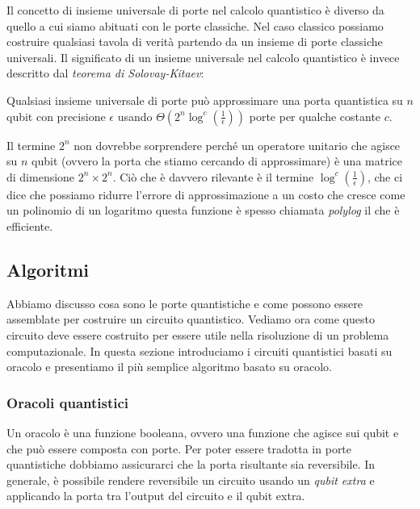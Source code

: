 Il concetto di insieme universale di porte nel calcolo quantistico è diverso da quello a cui siamo abituati con le porte classiche. Nel caso classico possiamo costruire qualsiasi tavola di verità partendo da un insieme di porte classiche universali. Il significato di un insieme universale nel calcolo quantistico è invece descritto dal \emph{teorema di Solovay-Kitaev}:
\begin{theorem}
	Qualsiasi insieme universale di porte può approssimare una porta quantistica su $n$ qubit con precisione $\epsilon$ usando $\Theta(2^n\log^c(\frac{1}{\epsilon}))$ porte per qualche costante $c$.
\end{theorem} 

Il termine $2^n$ non dovrebbe sorprendere perché un operatore unitario che agisce su $n$ qubit (ovvero la porta che stiamo cercando di approssimare) è una matrice di dimensione $2^n \times 2^n$. Ciò che è davvero rilevante è il termine $\log^c(\frac{1}{\epsilon})$, che ci dice che possiamo ridurre l'errore di approssimazione a un costo che cresce come un polinomio di un logaritmo \textemdash{}questa funzione è spesso chiamata \emph{polylog}\textemdash{} il che è efficiente.

\subsection{Algoritmi}
\label{sec:qa_algo}
Abbiamo discusso cosa sono le porte quantistiche e come possono essere assemblate per costruire un circuito quantistico. Vediamo ora come questo circuito deve essere costruito per essere utile nella risoluzione di un problema computazionale. In questa sezione introduciamo i circuiti quantistici basati su oracolo e presentiamo il più semplice algoritmo basato su oracolo.

\subsubsection*{Oracoli quantistici}
Un oracolo è una funzione booleana, ovvero una funzione che agisce sui qubit e che può essere composta con porte. Per poter essere tradotta in porte quantistiche dobbiamo assicurarci che la porta risultante sia reversibile. In generale, è possibile rendere reversibile un circuito usando un \emph{qubit extra} e applicando la porta  tra l'output del circuito e il qubit extra. 


